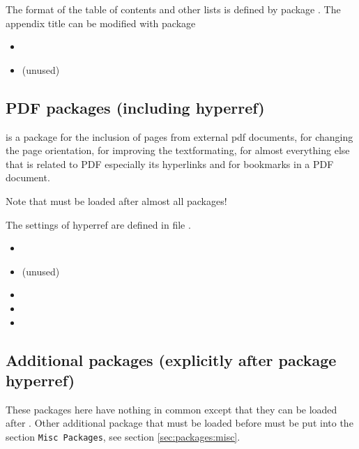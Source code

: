 The format of the table of contents and other lists is defined by package . The appendix title can be modified with package 

\begin{itemize}[noitemsep]
\item {}
\item {} (unused)
\end{itemize}


\subsection{PDF packages (including hyperref)}

 is a package for the inclusion of pages from external pdf documents,
 for changing the page orientation,
 for improving the textformating,
 for almost everything else that is related to PDF especially its hyperlinks and 
 for bookmarks in a PDF document.

Note that  must be loaded after almost all packages!

The settings of hyperref are defined in file .

\begin{itemize}[noitemsep]
\item {}
\item {} (unused)
\item {}
\item {}
\item {}
\end{itemize}


\subsection{Additional packages  (explicitly after package hyperref)}

These packages here have nothing in common except that they can be loaded after . Other additional package that must be loaded before must be put into the section \texttt{Misc Packages}, see section \cref{sec:packages:misc}.

